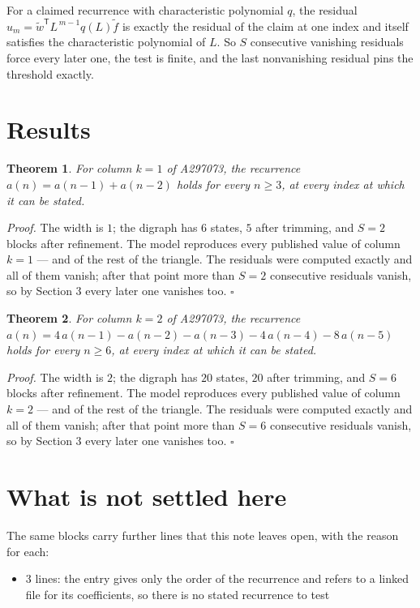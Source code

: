 \documentclass[11pt]{article}
\newtheorem{theorem}{Theorem}
\theoremstyle{definition}
\begin{document}
For a claimed recurrence with characteristic polynomial $q$, the residual $u_m = \tilde w^{\mathsf T}L^{\,m-1}q(L)\tilde f$ is exactly the residual of the claim at one index and itself satisfies the characteristic polynomial of $L$. So $S$ consecutive vanishing residuals force every later one, the test is finite, and the last nonvanishing residual pins the threshold exactly.

\section{Results}

\begin{theorem} For column $k = 1$ of A297073, the recurrence $a(n) = a(n-1) + a(n-2)$ holds for every $n \ge 3$, at every index at which it can be stated.\end{theorem}

{\itshape Proof.} The width is $1$; the digraph has $6$ states, $5$ after trimming, and $S = 2$ blocks after refinement. The model reproduces every published value of column $k = 1$ --- and of the rest of the triangle. The residuals were computed exactly and all of them vanish; after that point more than $S = 2$ consecutive residuals vanish, so by Section 3 every later one vanishes too. $\square$

\begin{theorem} For column $k = 2$ of A297073, the recurrence $a(n) = 4\,a(n-1) - a(n-2) - a(n-3) - 4\,a(n-4) - 8\,a(n-5)$ holds for every $n \ge 6$, at every index at which it can be stated.\end{theorem}

{\itshape Proof.} The width is $2$; the digraph has $20$ states, $20$ after trimming, and $S = 6$ blocks after refinement. The model reproduces every published value of column $k = 2$ --- and of the rest of the triangle. The residuals were computed exactly and all of them vanish; after that point more than $S = 6$ consecutive residuals vanish, so by Section 3 every later one vanishes too. $\square$

\section{What is not settled here}

The same blocks carry further lines that this note leaves open, with the reason for each:

\begin{itemize}

\item 3 lines: the entry gives only the order of the recurrence and refers to a linked file for its coefficients, so there is no stated recurrence to test

\end{itemize}
\end{document}
